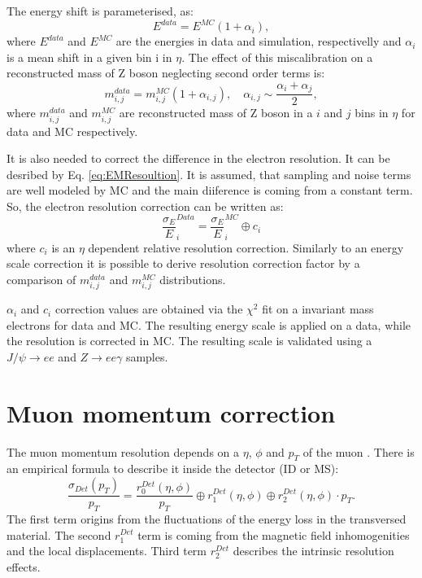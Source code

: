 The energy shift is parameterised, as:
\begin{equation}
E^{data}=E^{MC}(1+\alpha_i),
\end{equation}
where $E^{data}$ and $E^{MC}$ are the energies in data and simulation, respectivelly and $\alpha_i$ is a mean shift in a given bin i in $\eta$. The effect of this miscalibration on a reconstructed mass of Z boson neglecting second order terms is:
\begin{equation}
m_{i,j}^{data}=m_{i,j}^{MC}(1+\alpha_{i,j}), \quad \alpha_{i,j} \sim \frac{\alpha_i+\alpha_j}{2}, 
\end{equation}
where $m_{i,j}^{data}$ and $m_{i,j}^{MC}$ are reconstructed mass of Z boson in a $i$ and $j$ bins in $\eta$ for data and MC respectively. 

It is also needed to correct the difference in the electron resolution. It can be desribed by Eq. \ref{eq:EMResoultion}. It is assumed, that sampling and noise terms are well modeled by MC and the main diiference is coming from a constant term. 
So, the electron resolution correction can be written as:
\begin{equation}
\frac{\sigma_E}{E}^{Data}_{i}=\frac{\sigma_E}{E}^{MC}_{i} \oplus c_i
\end{equation}
where $c_i$ is an $\eta$ dependent relative resolution correction. Similarly to an energy scale correction it is possible to derive resolution correction factor by a comparison  of $m_{i,j}^{data}$ and $m_{i,j}^{MC}$ distributions. 

$\alpha_i$ and $c_i$ correction values are obtained via the $\chi^2$ fit on a invariant mass electrons for data and MC. The resulting energy scale is applied on a data, while the resolution is corrected in MC. The resulting scale is validated using a $J/\psi \to ee$ and $Z\to ee \gamma$ samples.

\section{Muon momentum correction}
The muon momentum resolution depends on a $\eta$, $\phi$ and $p_T$ of the muon \cite{AtlasExperiment}. There is an empirical formula to describe it inside the detector (ID or MS):
\begin{equation}\label{eq:MuonResolution}
\frac{\sigma_{Det}(p_T)}{p_T}=\frac{r^{Det}_0(\eta, \phi)}{p_T} \oplus r^{Det}_1 (\eta, \phi)  \oplus r^{Det}_2(\eta, \phi) \cdot p_T.
\end{equation}
The first term origins from the fluctuations of the energy loss in the transversed material. The second $r^{Det}_1$ term is coming from the magnetic field inhomogenities and the local displacements. Third term $r^{Det}_2$ describes the intrinsic resolution effects. 

